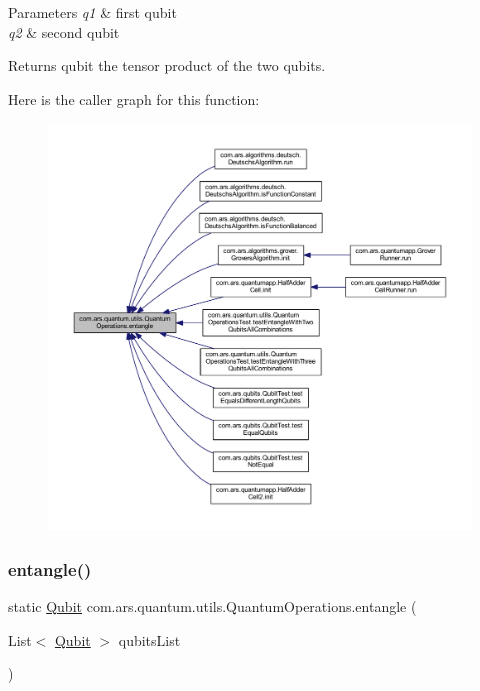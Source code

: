 \begin{DoxyParams}{Parameters}
{\em q1} & first qubit \\
\hline
{\em q2} & second qubit \\
\hline
\end{DoxyParams}
\begin{DoxyReturn}{Returns}
qubit the tensor product of the two qubits. 
\end{DoxyReturn}
Here is the caller graph for this function\+:
\nopagebreak
\begin{figure}[H]
\begin{center}
\leavevmode
\includegraphics[width=350pt]{classcom_1_1ars_1_1quantum_1_1utils_1_1_quantum_operations_aea9e037d8e8f70173be3feb5ee89ddc4_icgraph}
\end{center}
\end{figure}
\hypertarget{classcom_1_1ars_1_1quantum_1_1utils_1_1_quantum_operations_a07fa9b19071084da9dee99b449fc2e26}{}\label{classcom_1_1ars_1_1quantum_1_1utils_1_1_quantum_operations_a07fa9b19071084da9dee99b449fc2e26} 
\subsubsection{\texorpdfstring{entangle()}{entangle()}\hspace{0.1cm}{\footnotesize\ttfamily [2/2]}}
{\footnotesize\ttfamily static \hyperlink{classcom_1_1ars_1_1qubits_1_1_qubit}{Qubit} com.\+ars.\+quantum.\+utils.\+Quantum\+Operations.\+entangle (\begin{DoxyParamCaption}\item[{List$<$ \hyperlink{classcom_1_1ars_1_1qubits_1_1_qubit}{Qubit} $>$}]{qubits\+List }\end{DoxyParamCaption})\hspace{0.3cm}{\ttfamily [static]}}

